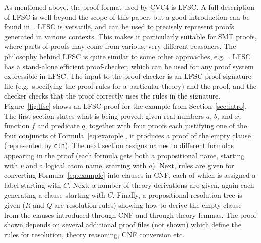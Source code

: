 \documentclass{llncs}
\begin{document}
As mentioned above, the proof format used by CVC4 is LFSC.  A full description
of LFSC is well beyond the scope of this paper, but a good introduction can be
found in~\cite{SOR+13}.  LFSC is versatile, and can be used to precisely represent proofs generated in various contexts.  This makes it particularly suitable for SMT proofs, where parts of
proofs may come from various, very different reasoners.  The
philosophy behind LFSC is quite similar to some other
approaches, e.g.~\cite{B13}.  LFSC has a stand-alone efficient proof-checker, which can be used for any proof
system expressible in LFSC.  The input to the proof checker is an LFSC
proof signature file (e.g.\ specifying the proof rules for a particular theory) and the proof, and the checker checks that the proof correctly
uses the rules in the signature.  Figure~\ref{fig:lfsc} shows an LFSC proof for the example from
Section~\ref{sec:intro}.
The first section states what is being proved: given real numbers $a$, $b$, and
$x$, function $f$ and predicate $q$, together with four proofs each justifying
one of the four conjuncts of Formula~\ref{eq:example}, it produces a proof of
the empty clause (represented by {\tt cln}).  The next section assigns names to
different formulas appearing in the proof (each formula gets both a
propositional name, starting with $v$ and a logical atom name, starting with
$a$).  Next, rules are given for converting Formula~\ref{eq:example} into
clauses in CNF, each of which is assigned a label starting with $C$.  Next, a number of
theory derivations are given, again each generating a clause starting with
$C$.  Finally, a propositional resolution tree is given ($R$ and $Q$ are
resolution rules) showing how to derive
the empty clause from the clauses introduced through CNF and through theory
lemmas.  The proof shown depends on several additional proof files (not shown)
which define the rules for resolution, theory reasoning, CNF conversion etc.
\end{document}
